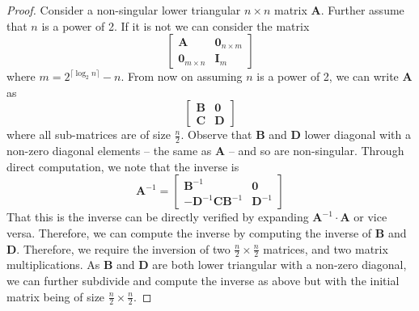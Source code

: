 \documentclass{article}
\newtheorem{theorem}{Theorem}[section]
\newcommand{\matsize}[2]{#1\times #2}
\newcommand{\mat}[1]{\mathbf{#1}}
\begin{document}
 \thmmatrixinv*
 \begin{proof}
  Consider a non-singular lower triangular  $\matsize{n}{n}$ matrix $\mat{A}$.  Further assume that $n$ is a power of 2. If it is not we can consider the matrix 
 \[\begin{bmatrix}\mat{A} & \mat{0}_{\matsize{n}{m}}\\ \mat{0}_{\matsize{m}{n}} & \mat{I}_{m}\end{bmatrix}\]
 where $m=2^{\lceil \log_2 n\rceil} - n$. 
From now on assuming $n$ is a power of 2, we can write $\mat{A}$ as
 \[
     \begin{bmatrix}
         \mat{B}&\mat{0} \\
         \mat{C} &\mat{D}
     \end{bmatrix}\]
 where all sub-matrices are of size $\frac{n}{2}$.
 Observe that $\mat{B}$ and $\mat{D}$ lower diagonal with a non-zero diagonal elements  -- the same as $\mat{A}$ -- and so are non-singular. Through direct computation, we note that the inverse is 
 \[\mat{A}^{-1} = 
     \begin{bmatrix}
         \mat{B}^{-1}&\mat{0} \\
         -\mat{D}^{-1}\mat{C}\mat{B}^{-1} &\mat{D}^{-1}  
     \end{bmatrix}\]
 That this is the inverse can be directly verified by expanding $\mat{A}^{-1} \cdot \mat{A}$ or vice versa. Therefore, we can compute the inverse by computing the inverse of $\mat{B}$ and $\mat{D}$.
 Therefore, we require the inversion of two $\matsize{\frac{n}{2}}{\frac{n}{2}}$ matrices, and two matrix multiplications. 
%
 As $\mat{B}$ and $\mat{D}$ are both lower triangular with a non-zero diagonal, we can further subdivide and compute the inverse as above but with the initial matrix being of size $\matsize{\frac{n}{2}}{\frac{n}{2}}$.




\end{proof}
\end{document}
